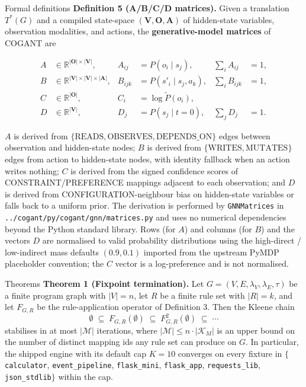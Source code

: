 \documentclass[
  ignorenonframetext,
]{beamer}
\begin{document}
\begin{frame}[fragile]{Formal definitions}
\textbf{Definition 5 (A/B/C/D matrices).} Given a translation
\(T^{*}(G)\) and a compiled state-space
\((\mathbf{V}, \mathbf{O}, \mathbf{A})\) of hidden-state variables,
observation modalities, and actions, the \textbf{generative-model
matrices} of COGANT are

\begin{align}
\label{eq:matrices-defn}
A &\in \mathbb{R}^{|\mathbf{O}| \times |\mathbf{V}|},    &A_{ij} &= P(o_i \mid s_j), & \sum_i A_{ij} &= 1, \\
B &\in \mathbb{R}^{|\mathbf{V}| \times |\mathbf{V}| \times |\mathbf{A}|}, & B_{i j k} &= P(s'_i \mid s_j, a_k), & \sum_i B_{ijk} &= 1, \\
C &\in \mathbb{R}^{|\mathbf{O}|}, & C_i &= \log \tilde{P}(o_i), & \\
D &\in \mathbb{R}^{|\mathbf{V}|}, & D_j &= P(s_j \mid t = 0), & \sum_j D_j &= 1.
\end{align}

\(A\) is derived from
\(\{\text{READS}, \text{OBSERVES}, \text{DEPENDS\_ON}\}\) edges between
observation and hidden-state nodes; \(B\) is derived from
\(\{\text{WRITES}, \text{MUTATES}\}\) edges from action to hidden-state
nodes, with identity fallback when an action writes nothing; \(C\) is
derived from the signed confidence scores of CONSTRAINT/PREFERENCE
mappings adjacent to each observation; and \(D\) is derived from
CONFIGURATION-neighbour bias on hidden-state variables or falls back to
a uniform prior. The derivation is performed by \texttt{GNNMatrices} in
\texttt{../cogant/py/cogant/gnn/matrices.py} and uses no numerical
dependencies beyond the Python standard library. Rows (for \(A\)) and
columns (for \(B\)) and the vectors \(D\) are normalised to valid
probability distributions using the high-direct / low-indirect mass
defaults \((0.9, 0.1)\) imported from the upstream PyMDP placeholder
convention; the \(C\) vector is a log-preference and is not normalised.

\begin{block}{Theorems}
\protect{}\label{theorems}
\textbf{Theorem 1 (Fixpoint termination).} Let
\(G = (V, E, \lambda_V, \lambda_E, \tau)\) be a finite program graph
with \(|V| = n\), let \(R\) be a finite rule set with \(|R| = k\), and
let \(F_{G,R}\) be the rule-application operator of Definition 3. Then
the Kleene chain \begin{equation}
\label{eq:kleene-chain}
\emptyset \;\subseteq\; F_{G,R}(\emptyset) \;\subseteq\; F_{G,R}^{2}(\emptyset) \;\subseteq\; \cdots
\end{equation} stabilises in at most \(|\mathcal{M}|\) iterations, where
\(|\mathcal{M}| \leq n \cdot |\mathcal{K}_M|\) is an upper bound on the
number of distinct mapping ids any rule set can produce on \(G\). In
particular, the shipped engine with its default cap \(K = 10\) converges
on every fixture in \(\{\)\texttt{calculator}, \texttt{event\_pipeline},
\texttt{flask\_mini}, \texttt{flask\_app}, \texttt{requests\_lib},
\texttt{json\_stdlib}\(\}\) within the cap.


\end{block}
\end{frame}
\end{document}
